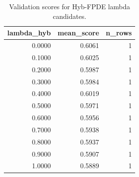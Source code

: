 \begin{table}[t]
\caption{Validation scores for Hyb-FPDE lambda candidates.}
\label{tab:lambda_distribution_computed}
\centering
\begin{tabular}{rrr}
\toprule
lambda\_hyb & mean\_score & n\_rows \\
\midrule
0.0000 & 0.6061 & 1 \\
0.1000 & 0.6025 & 1 \\
0.2000 & 0.5987 & 1 \\
0.3000 & 0.5984 & 1 \\
0.4000 & 0.6019 & 1 \\
0.5000 & 0.5971 & 1 \\
0.6000 & 0.5956 & 1 \\
0.7000 & 0.5938 & 1 \\
0.8000 & 0.5937 & 1 \\
0.9000 & 0.5907 & 1 \\
1.0000 & 0.5889 & 1 \\
\bottomrule
\end{tabular}

\end{table}
